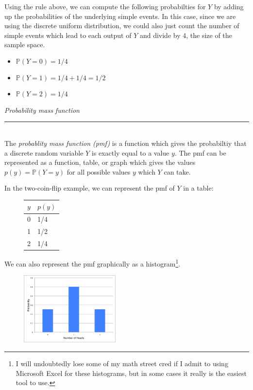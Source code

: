 \documentclass[12pt]{article}
\theoremstyle{definition}
\theoremstyle{remark}
\def\P{{\mathbb P}}
\begin{document}
Using the rule above, we can compute the following probabilties for $Y$ by adding up the probabilities of the underlying simple events. In this case, since we are using the discrete uniform distribution, we could also just count the number of simple events which lead to each output of $Y$ and divide by 4, the size of the sample space.
\begin{itemize}[noitemsep]
\item $\P(Y = 0) = 1/4$
\item $\P(Y = 1) = 1/4 + 1/4 = 1/2$
\item $\P(Y = 2) = 1/4$
\end{itemize}

\begin{framed}
  \emph{Probability mass function }\\
  \rule{\dimexpr{}\fboxrule}{.1pt} \\
  The \emph{probablity mass function (pmf)} is a function which gives the probabiltiy that a discrete random variable $Y$ is exactly equal to a value $y$. The pmf can be represented as a function, table, or graph which gives the values $p(y) = \P(Y = y)$ for all possible values $y$ which $Y$ can take.
\end{framed}

In the two-coin-flip example, we can represent the pmf of $Y$ in a table:
\begin{figure}[H]
\centering
\begin{tabular}{l@{\hskip 2cm}l}
\toprule
$y$ & $p(y)$\\
\midrule
0 & 1/4\\
1 & 1/2\\
2 & 1/4\\
\bottomrule
\end{tabular}
\end{figure}

We can also represent the pmf graphically as a histogram\footnote{I will undoubtedly lose some of my math street cred if I admit to using Microsoft Excel for these histograms, but in some cases it really is the easiest tool to use.}.
\begin{figure}[H]
\centering
\includegraphics[width=5cm]{2coinshisto}
\end{figure}
\end{document}
